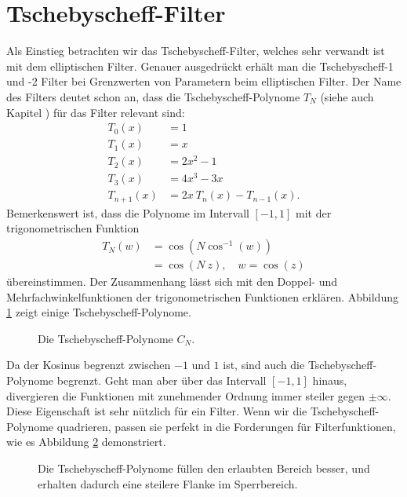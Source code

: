 \section{Tschebyscheff-Filter}

Als Einstieg betrachten wir das Tschebyscheff-Filter, welches sehr verwandt ist mit dem elliptischen Filter.
Genauer ausgedrückt erhält man die Tschebyscheff-1 und -2 Filter bei Grenzwerten von Parametern beim elliptischen Filter.
Der Name des Filters deutet schon an, dass die Tschebyscheff-Polynome $T_N$ (siehe auch Kapitel \label{buch:polynome:section:tschebyscheff}) für das Filter relevant sind:
\begin{align}
    T_{0}(x)&=1\\
    T_{1}(x)&=x\\
    T_{2}(x)&=2x^{2}-1\\
    T_{3}(x)&=4x^{3}-3x\\
    T_{n+1}(x)&=2x~T_{n}(x)-T_{n-1}(x).
\end{align}
Bemerkenswert ist, dass die Polynome im Intervall $[-1, 1]$ mit der trigonometrischen Funktion
\begin{align} \label{ellfilter:eq:chebychef_polynomials}
    T_N(w) &= \cos \left( N \cos^{-1}(w) \right) \\
           &= \cos \left(N~z \right), \quad w= \cos(z)
\end{align}
übereinstimmen.
Der Zusammenhang lässt sich mit den Doppel- und Mehrfachwinkelfunktionen der trigonometrischen Funktionen erklären.
Abbildung \ref{ellfilter:fig:chebychef_polynomials} zeigt einige Tschebyscheff-Polynome.
\begin{figure}
    \centering
    
    \caption{Die Tschebyscheff-Polynome $C_N$.}
    \label{ellfilter:fig:chebychef_polynomials}
\end{figure}
Da der Kosinus begrenzt zwischen $-1$ und $1$ ist, sind auch die Tschebyscheff-Polynome begrenzt.
Geht man aber über das Intervall $[-1, 1]$ hinaus, divergieren die Funktionen mit zunehmender Ordnung immer steiler gegen $\pm \infty$.
Diese Eigenschaft ist sehr nützlich für ein Filter.
Wenn wir die Tschebyscheff-Polynome quadrieren, passen sie perfekt in die Forderungen für Filterfunktionen, wie es Abbildung \ref{ellfiter:fig:chebychef} demonstriert.
\begin{figure}
    \centering
    
    \caption{Die Tschebyscheff-Polynome füllen den erlaubten Bereich besser, und erhalten dadurch eine steilere Flanke im Sperrbereich.}
    \label{ellfiter:fig:chebychef}
\end{figure}

